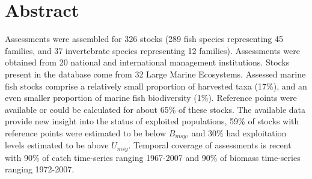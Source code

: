 \section*{Abstract}

Assessments were assembled for 326 stocks
(289 fish species representing
45 families, and 37
invertebrate species representing 12
families). Assessments were obtained from 20 national
and international management institutions. Stocks
present in the database come from 32 Large
Marine Ecosystems. Assessed marine fish stocks
comprise a relatively small proportion of harvested taxa
(17\%), and an even smaller proportion of
marine fish biodiversity (1\%). Reference
points were available or could be calculated for about
65\% of these stocks. The available data
provide new insight into the status of exploited populations,
59\% of stocks with reference points
were estimated to be below $B_{msy}$, and
30\% had exploitation levels
estimated to be above $U_{msy}$. Temporal coverage of assessments is
recent with 90\% of catch time-series ranging 1967-2007
and 90\% of biomass time-series ranging 1972-2007.


